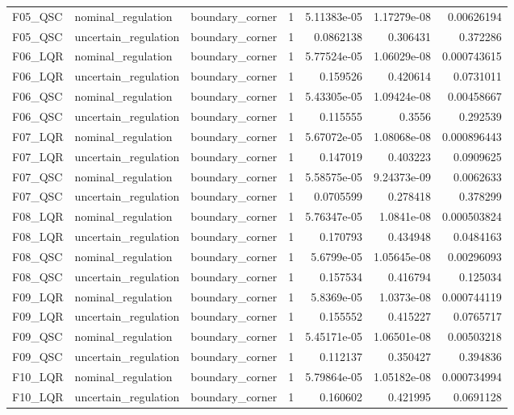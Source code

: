 \begin{tabular}{llllrrr}
F05\_QSC & nominal\_regulation & boundary\_corner & 1 & 5.11383e-05 & 1.17279e-08 & 0.00626194 \\
F05\_QSC & uncertain\_regulation & boundary\_corner & 1 & 0.0862138 & 0.306431 & 0.372286 \\
F06\_LQR & nominal\_regulation & boundary\_corner & 1 & 5.77524e-05 & 1.06029e-08 & 0.000743615 \\
F06\_LQR & uncertain\_regulation & boundary\_corner & 1 & 0.159526 & 0.420614 & 0.0731011 \\
F06\_QSC & nominal\_regulation & boundary\_corner & 1 & 5.43305e-05 & 1.09424e-08 & 0.00458667 \\
F06\_QSC & uncertain\_regulation & boundary\_corner & 1 & 0.115555 & 0.3556 & 0.292539 \\
F07\_LQR & nominal\_regulation & boundary\_corner & 1 & 5.67072e-05 & 1.08068e-08 & 0.000896443 \\
F07\_LQR & uncertain\_regulation & boundary\_corner & 1 & 0.147019 & 0.403223 & 0.0909625 \\
F07\_QSC & nominal\_regulation & boundary\_corner & 1 & 5.58575e-05 & 9.24373e-09 & 0.0062633 \\
F07\_QSC & uncertain\_regulation & boundary\_corner & 1 & 0.0705599 & 0.278418 & 0.378299 \\
F08\_LQR & nominal\_regulation & boundary\_corner & 1 & 5.76347e-05 & 1.0841e-08 & 0.000503824 \\
F08\_LQR & uncertain\_regulation & boundary\_corner & 1 & 0.170793 & 0.434948 & 0.0484163 \\
F08\_QSC & nominal\_regulation & boundary\_corner & 1 & 5.6799e-05 & 1.05645e-08 & 0.00296093 \\
F08\_QSC & uncertain\_regulation & boundary\_corner & 1 & 0.157534 & 0.416794 & 0.125034 \\
F09\_LQR & nominal\_regulation & boundary\_corner & 1 & 5.8369e-05 & 1.0373e-08 & 0.000744119 \\
F09\_LQR & uncertain\_regulation & boundary\_corner & 1 & 0.155552 & 0.415227 & 0.0765717 \\
F09\_QSC & nominal\_regulation & boundary\_corner & 1 & 5.45171e-05 & 1.06501e-08 & 0.00503218 \\
F09\_QSC & uncertain\_regulation & boundary\_corner & 1 & 0.112137 & 0.350427 & 0.394836 \\
F10\_LQR & nominal\_regulation & boundary\_corner & 1 & 5.79864e-05 & 1.05182e-08 & 0.000734994 \\
F10\_LQR & uncertain\_regulation & boundary\_corner & 1 & 0.160602 & 0.421995 & 0.0691128 \\

\end{tabular}
